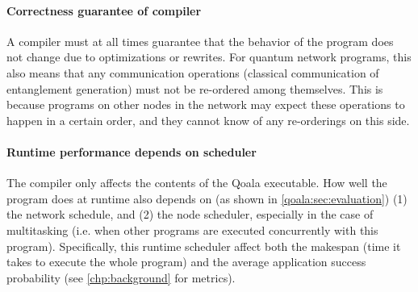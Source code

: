 \paragraph{Correctness guarantee of compiler}
A compiler must at all times guarantee that the behavior of the program does not change due to optimizations or rewrites.
For quantum network programs, this also means that any communication operations (classical communication of entanglement generation) must not be re-ordered among themselves.
This is because programs on other nodes in the network may expect these operations to happen in a certain order, and they cannot know of any re-orderings on this side.

\paragraph{Runtime performance depends on scheduler}
The compiler only affects the contents of the Qoala executable.
How well the program does at runtime also depends on (as shown in \cref{qoala:sec:evaluation})
(1) the network schedule, and (2) the node scheduler, especially in the case of multitasking (i.e. when other programs are executed concurrently with this program).
Specifically, this runtime scheduler affect both the makespan (time it takes to execute the whole program) and the average application success probability (see \cref{chp:background} for metrics).

